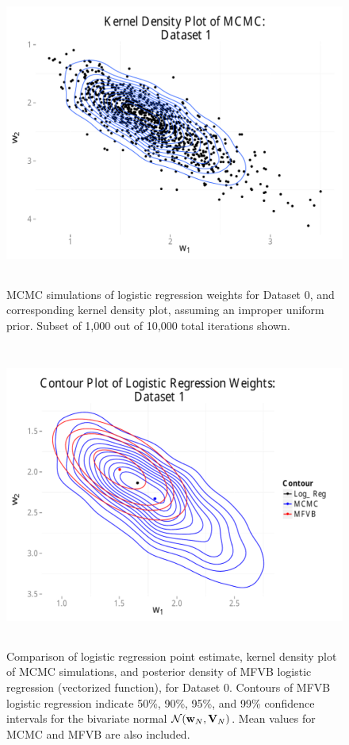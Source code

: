 \begin{figure}
\centering
	\includegraphics[height=100mm]{figures/mcmc_uniform_2d.pdf}
    \caption{MCMC simulations of logistic regression weights for Dataset 0, and corresponding kernel density plot, assuming 
    an improper uniform prior.  Subset of 1,000 out of 10,000 total iterations shown.}  \label{fig:mcmc_kernel}  
\end{figure}

\begin{figure}
\centering
	\includegraphics[height=100mm]{figures/mcmc_uniform_mfvb.pdf}
    \caption{Comparison of logistic regression point estimate, kernel density plot of MCMC simulations, and posterior density of
    MFVB logistic regression (vectorized function), for Dataset 0.   Contours of MFVB logistic regression indicate
    50\%, 90\%, 95\%, and 99\% confidence intervals for the bivariate normal $\mathcal{N}(\boldsymbol{\mathbf{w}}_{N},\boldsymbol{\mathbf{V}}_N)$.
    Mean values for MCMC and MFVB are also included.}  \label{fig:mcmc_mfvb}  
\end{figure}